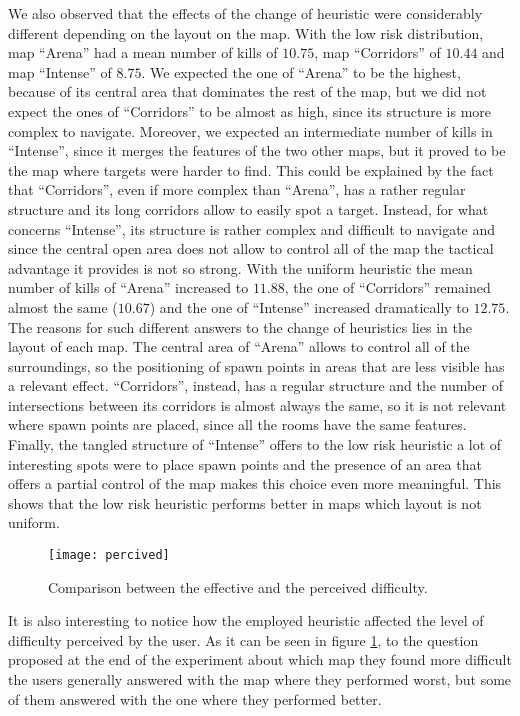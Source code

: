 We also observed that the effects of the change of heuristic were considerably different depending on the layout on the map. With the low risk distribution, map ``Arena'' had a mean number of kills of $10.75$, map ``Corridors'' of $10.44$ and map ``Intense'' of $8.75$. We expected the one of ``Arena'' to be the highest, because of its central area that dominates the rest of the map, but we did not expect the ones of ``Corridors'' to be almost as high, since its structure is more complex to navigate. Moreover, we expected an intermediate number of kills in ``Intense'', since it merges the features of the two other maps, but it proved to be the map where targets were harder to find. This could be explained by the fact that ``Corridors'', even if more complex than ``Arena'', has a rather regular structure and its long corridors allow to easily spot a target. Instead, for what concerns ``Intense'', its structure is rather complex and difficult to navigate and since the central open area does not allow to control all of the map the tactical advantage it provides is not so strong. With the uniform heuristic the mean number of kills of ``Arena'' increased to $11.88$, the one of ``Corridors'' remained almost the same ($10.67$) and the one of ``Intense'' increased dramatically to $12.75$. The reasons for such different answers to the change of heuristics lies in the layout of each map. The central area of ``Arena'' allows to control all of the surroundings, so the positioning of spawn points in areas that are less visible has a relevant effect. ``Corridors'', instead, has a regular structure and the number of intersections between its corridors is almost always the same, so it is not relevant where spawn points are placed, since all the rooms have the same features. Finally, the tangled structure of ``Intense'' offers to the low risk heuristic a lot of interesting spots were to place spawn points and the presence of an area that offers a partial control of the map makes this choice even more meaningful. This shows that the low risk heuristic performs better in maps which layout is not uniform.

\begin{figure}
 	\centering
	\texttt{[image: percived]}
	\caption{Comparison between the effective and the perceived difficulty.}
	\label{img:percived}		
\end{figure}

It is also interesting to notice how the employed heuristic affected the level of difficulty perceived by the user. As it can be seen in figure \ref{img:percived}, to the question proposed at the end of the experiment about which map they found more difficult the users generally answered with the map where they performed worst, but some of them answered with the one where they performed better.

